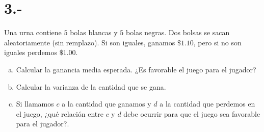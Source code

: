 \documentclass{article}
\begin{document}
\section*{3.-}
Una urna contiene $5$ bolas blancas y $5$ bolas negras. Dos bolsas se sacan aleatoriamente (sin remplazo).
Si son iguales, ganamos $\$1.10$, pero si no son iguales perdemos $\$1.00$.
\begin{enumerate}[a)]
    \item Calcular la ganancia media esperada. ¿Es favorable el juego para el jugador?
    \item Calcular la varianza de la cantidad que se gana.
    \item Si llamamos $c$ a la cantidad que ganamos y $d$ a la cantidad que perdemos en el juego,
    ¿qué relación entre $c$ y $d$ debe ocurrir para que el juego sea favorable para el jugador?.
\end{enumerate}
\end{document}
